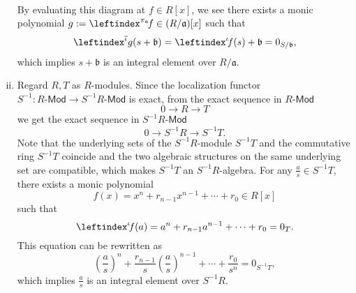 \begin{prf}
\begin{enumerate}[(i)]
\[\begin{tikzcd}
            \end{tikzcd}
    \]
    By evaluating this diagram at $f \in R[x]$, we see there exists a monic polynomial $g:=\leftindex^{\pi_\mathfrak{a}}\!f \in (R/\mathfrak{a})[x]$ such that 
    \[
    \leftindex^{\overline{\iota}}g(s+\mathfrak{b})=\leftindex^{\iota}\!f(s)+\mathfrak{b}=0_{S/\mathfrak{b}},
    \]
    which implies $s+\mathfrak{b}$ is an integral element over $R/\mathfrak{a}$.
    \item Regard $R,T$ as $R$-modules. Since the localization functor $S^{-1}:R\text{-}\mathsf{Mod}\to S^{-1}R\text{-}\mathsf{Mod}$ is exact, from the exact sequence in $R\text{-}\mathsf{Mod}$
    \[
    0\longrightarrow R\longrightarrow T
    \]
    we get the exact sequence in $S^{-1}R\text{-}\mathsf{Mod}$
    \[
    0\longrightarrow S^{-1}R\longrightarrow S^{-1}T.
    \]
    Note that the underlying sets of the $S^{-1}R$-module $S^{-1}T$ and the commutative ring $S^{-1}T$ coincide and the two algebraic structures on the same underlying set are compatible, which makes $S^{-1}T$ an $S^{-1}R$-algebra. 
    For any $\frac{a}{s}\in S^{-1}T$, there exists a monic polynomial
    \[
    f(x)=x^n+r_{n-1}x^{n-1}+\cdots+r_0\in R[x]
    \]
    such that 
    \[
        \leftindex^{\iota}\!f(a)=a^n+r_{n-1}a^{n-1}+\cdots+r_0=0_T.
    \]
    This equation can be rewritten as
    \[
\left(\frac{a}{s}\right)^n+\frac{r_{n-1}}{s}\left(\frac{a}{s}\right)^{n-1}+\cdots+\frac{r_0}{s^n}=0_{S^{-1}T},
    \]
    which implies $\frac{a}{s}$ is an integral element over $S^{-1}R$.
    

\end{enumerate}
\end{prf}

